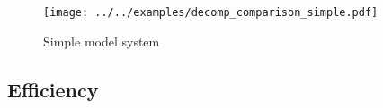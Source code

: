 \documentclass[%
 reprint,
superscriptaddress,
showpacs,
 amsmath,amssymb,
 aps,
 prb,
longbibliography,
]{revtex4-1}
\begin{document}
\begin{figure}[h]
	\texttt{[image: ../../examples/decomp\_comparison\_simple.pdf]}
	\caption{Simple model system \label{fig:decomp_comparison_simple}}
\end{figure}




\subsection{Efficiency}













\clearpage

\end{document}
